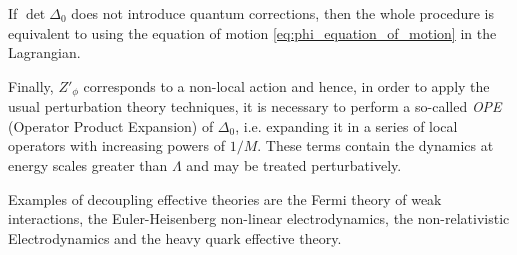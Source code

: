 If $\det{\Delta_0}$ does not introduce quantum corrections, then the whole procedure is equivalent to using the equation of motion \eqref{eq:phi_equation_of_motion} in the Lagrangian.

Finally, $Z'_\phi$ corresponds to a non-local action and hence, in order to apply the usual perturbation theory techniques, it is necessary to perform a so-called \emph{OPE} (Operator Product Expansion) of $\Delta_0$, i.e. expanding it in a series of local operators with increasing powers of $1/M$. These terms contain the dynamics at energy scales greater than $\Lambda$ and may be treated perturbatively.

Examples of decoupling effective theories are the Fermi theory of weak interactions, the Euler-Heisenberg non-linear electrodynamics, the non-relativistic Electrodynamics and the heavy quark effective theory.

